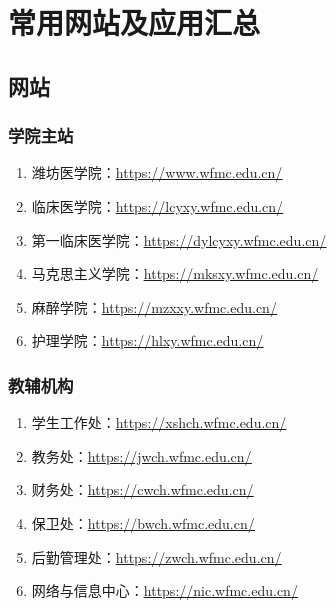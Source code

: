 \chapter[常用网站及应用汇总]{常用网站及应用汇总}
\section[网站]{网站}
\subsection[学院主站]{学院主站}
\begin{enumerate}
    \item 潍坊医学院：\uline{\href{https://www.wfmc.edu.cn/}{https://www.wfmc.edu.cn/}}
    \item 临床医学院：\uline{\href{https://lcyxy.wfmc.edu.cn/}{https://lcyxy.wfmc.edu.cn/}}
    \item 第一临床医学院：\uline{\href{https://dylcyxy.wfmc.edu.cn/}{https://dylcyxy.wfmc.edu.cn/}}
    \item 马克思主义学院：\uline{\href{https://mksxy.wfmc.edu.cn/}{https://mksxy.wfmc.edu.cn/}}
    \item 麻醉学院：\uline{\href{https://mzxxy.wfmc.edu.cn/}{https://mzxxy.wfmc.edu.cn/}}
    \item 护理学院：\uline{\href{https://hlxy.wfmc.edu.cn/}{https://hlxy.wfmc.edu.cn/}}
\end{enumerate}

\subsection[教辅机构]{教辅机构}
\begin{enumerate}
    \item 学生工作处：\uline{\href{https://xshch.wfmc.edu.cn/}{https://xshch.wfmc.edu.cn/}}
    \item 教务处：\uline{\href{https://jwch.wfmc.edu.cn/}{https://jwch.wfmc.edu.cn/}}
    \item 财务处：\uline{\href{https://cwch.wfmc.edu.cn/}{https://cwch.wfmc.edu.cn/}}
    \item 保卫处：\uline{\href{https://bwch.wfmc.edu.cn/}{https://bwch.wfmc.edu.cn/}}
    \item 后勤管理处：\uline{\href{https://zwch.wfmc.edu.cn/}{https://zwch.wfmc.edu.cn/}}
    \item 网络与信息中心：\uline{\href{https://nic.wfmc.edu.cn/}{https://nic.wfmc.edu.cn/}}
\end{enumerate}

